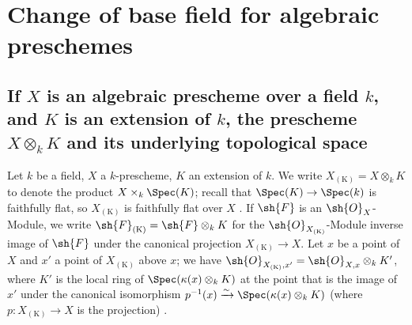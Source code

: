 \section{Change of base field for algebraic preschemes}
\label{section:IV.4}

\subsection{If \texorpdfstring{$X$}{X} is an algebraic prescheme over a field \texorpdfstring{$k$}{k}, and \texorpdfstring{$K$}{K} is an extension of \texorpdfstring{$k$}{k}, the prescheme \texorpdfstring{$X\otimes_k K$}{X x\_k K} and its underlying topological space}
\label{subsection:IV.4.1}


\begin{env}[4.1.1]
\label{IV.4.1.1}
Let $k$ be a field, $X$ a $k$-prescheme, $K$ an extension of $k$.
We write $X_{(\mathrm{K})}=X\otimes_k K$ to denote the product $X\times_k\Spec(K)$; recall that $\Spec(K)\to\Spec(k)$ is faithfully flat, so $X_{(\mathrm{K})}$ is faithfully flat over $X$ .
If $\sh{F}$ is an $\sh{O}_X$-Module, we write $\sh{F}_{(\mathrm{K})}=\sh{F}\otimes_k K$ for the $\sh{O}_{X_{(\mathrm{K})}}$-Module inverse image of $\sh{F}$ under the canonical projection $X_{(\mathrm{K})}\to X$.
Let $x$ be a point of $X$ and $x'$ a point of $X_{(\mathrm{K})}$ above $x$; we have $\sh{O}_{X_{(\mathrm{K})},x'}=\sh{O}_{X,x}\otimes_k K'$, where $K'$ is the local ring of $\Spec(\kappa(x)\otimes_k K)$ at the point that is the image of $x'$ under the canonical isomorphism $p^{-1}(x)\xrightarrow{\sim}\Spec(\kappa(x)\otimes_k K)$ (where $p:X_{(\mathrm{K})}\to X$ is the projection) .
\end{env}

